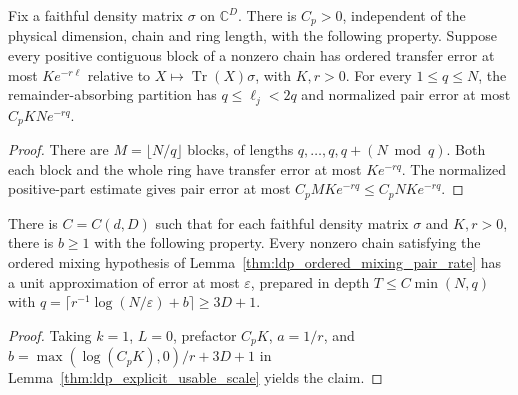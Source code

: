 \begin{lemma}
    \label{thm:ldp_ordered_mixing_pair_rate}
    \leanok
    Fix a faithful density matrix $\sigma$ on $\mathbb C^D$. There is
    $C_p>0$, independent of the physical dimension, chain and ring length,
    with the following property. Suppose every positive contiguous block
    of a nonzero chain has ordered transfer error at most $Ke^{-r\ell}$
    relative to $X\mapsto\operatorname{Tr}(X)\sigma$, with $K,r>0$.
    For every $1\le q\le N$, the remainder-absorbing partition has
    $q\le\ell_j<2q$ and normalized pair error at most $C_pKN e^{-rq}$.
\end{lemma}
\begin{proof}
    \leanok
    There are $M=\lfloor N/q\rfloor$ blocks, of lengths
    $q,\ldots,q,q+(N\bmod q)$. Both each block and the whole ring have
    transfer error at most $Ke^{-rq}$. The normalized positive-part
    estimate gives pair error at most $C_pMKe^{-rq}\le C_pNKe^{-rq}$.
\end{proof}

\begin{lemma}
    \label{thm:ldp_ordered_mixing_explicit_scale}
    \leanok
    There is $C=C(d,D)$ such that for each faithful density matrix $\sigma$
    and $K,r>0$, there is $b\ge1$ with the following property. Every
    nonzero chain satisfying the ordered mixing hypothesis of
    Lemma~\ref{thm:ldp_ordered_mixing_pair_rate} has a unit approximation
    of error at most $\varepsilon$, prepared in depth
    $T\le C\min(N,q)$ with
    $q=\lceil r^{-1}\log(N/\varepsilon)+b\rceil\ge3D+1$.
\end{lemma}
\begin{proof}
    \leanok
    Taking $k=1$, $L=0$, prefactor $C_pK$, $a=1/r$, and
    $b=\max(\log(C_pK),0)/r+3D+1$ in
    Lemma~\ref{thm:ldp_explicit_usable_scale} yields the claim.
\end{proof}

